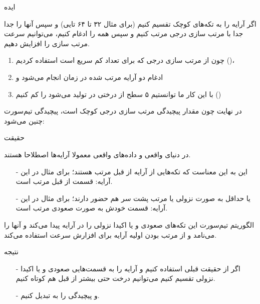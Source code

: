 \begin{frame}{ایده}
\begin{center}
{\large اگر آرایه را به تکه‌های کوچک تقسیم کنیم‌ (برای مثال ۳۲ تا ۶۴ تایی) و سپس آنها را جدا جدا با مرتب‌ سازی درجی مرتب کنیم و سپس همه را ادغام کنیم، می‌توانیم سرعت مرتب سازی را افزایش دهیم.}
\end{center}

\begin{enumerate}\itemr
\item
چون از مرتب سازی درجی که برای تعداد کم سریع است استفاده کردیم ()،
\item
ادغام دو آرایه مرتب شده در زمان 
انجام می‌شود و

\item 
با این کار ما توانستیم ۵ سطح از درختی در  تولید می‌شود را کم کنیم ()
\end{enumerate}

\begin{center}
{\large در نهایت چون مقدار پیچیدگی مرتب سازی درجی کوچک است، پیچیدگی  تیم‌سورت چنین می‌شود: }
\end{center}
\end{frame}

\begin{frame}{حقیقت}
\begin{center}
{\large در دنیای واقعی و داده‌های واقعی معمولا آرایه‌ها اصطلاحا 
هستند.}
\end{center}
\begin{itemize}\itemr
\item[-]
این به این معناست که تکه‌هایی از آرایه از قبل مرتب هستند؛ برای مثال در این آرایه:
\m{[5, 4, 1, 2, 3]}
قسمت 
\m{[1, 2, 3]}
از قبل مرتب است.
\item[-]
یا حداقل به صورت نزولی یا مرتب پشت سر هم حضور دارند؛ برای مثال در این آرایه:
\m{[6, 4, 1, 2, 3, 5, 7]}
قسمت
\m{[1, 2, 3, 5, 7]}
خودش به صورت صعودی مرتب است.
\end{itemize}

\begin{center}
{\large الگوریتم تیم‌سورت این تکه‌های صعودی و یا اکیدا نزولی را در آرایه پیدا می‌کند و آنها را  می‌نامد و از مرتب بودن اولیه آرایه برای افزارش سرعت استفاده می‌کند.}
\end{center}
\end{frame}

\begin{frame}{نتیجه}
\begin{itemize}\itemr
\item[-]
اگر از حقیقت قبلی استفاده کنیم و آرایه را به قسمت‌هایی صعودی و یا اکیدا نزولی تقسیم کنیم می‌توانیم درخت  حتی بیشتر از قبل هم کوتاه کنیم.

\item[-]
و پیچیدگی را به 
تبدیل کنیم.
\end{itemize}
\end{frame}